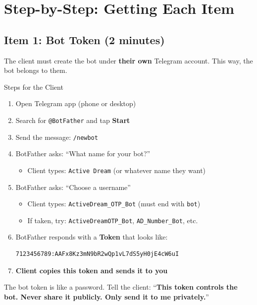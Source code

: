 \section{Step-by-Step: Getting Each Item}

\subsection{Item 1: Bot Token (2 minutes)}

The client must create the bot under \textbf{their own} Telegram account. This way, the bot belongs to them.

\begin{stepbox}{Steps for the Client}
\begin{enumerate}[leftmargin=1.5cm]
    \item Open Telegram app (phone or desktop)
    \item Search for \texttt{@BotFather} and tap \textbf{Start}
    \item Send the message: \texttt{/newbot}
    \item BotFather asks: ``What name for your bot?''
    \begin{itemize}
        \item Client types: \texttt{Active Dream} (or whatever name they want)
    \end{itemize}
    \item BotFather asks: ``Choose a username''
    \begin{itemize}
        \item Client types: \texttt{ActiveDream\_OTP\_Bot} (must end with \texttt{bot})
        \item If taken, try: \texttt{ActiveDreamOTP\_Bot}, \texttt{AD\_Number\_Bot}, etc.
    \end{itemize}
    \item BotFather responds with a \textbf{Token} that looks like:
    \begin{lstlisting}[style=termstyle]
7123456789:AAFx8Kz3mN9bR2wQp1vL7dS5yH0jE4cW6uI
    \end{lstlisting}
    \item \textbf{Client copies this token and sends it to you}
\end{enumerate}
\end{stepbox}

\begin{warningbox}
The bot token is like a password. Tell the client: ``\textbf{This token controls the bot. Never share it publicly. Only send it to me privately.}''
\end{warningbox}

